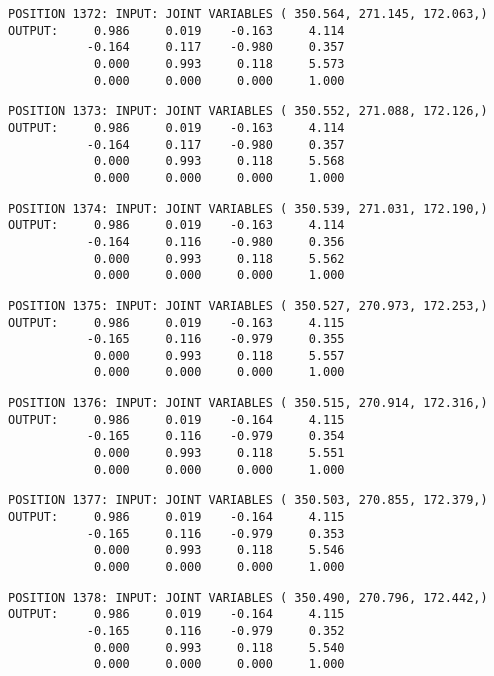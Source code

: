 \begin{verbatim}
POSITION 1372: INPUT: JOINT VARIABLES ( 350.564, 271.145, 172.063,)
OUTPUT:     0.986     0.019    -0.163     4.114
           -0.164     0.117    -0.980     0.357
            0.000     0.993     0.118     5.573
            0.000     0.000     0.000     1.000
\end{verbatim} \pagebreak[1]\begin{verbatim}
POSITION 1373: INPUT: JOINT VARIABLES ( 350.552, 271.088, 172.126,)
OUTPUT:     0.986     0.019    -0.163     4.114
           -0.164     0.117    -0.980     0.357
            0.000     0.993     0.118     5.568
            0.000     0.000     0.000     1.000
\end{verbatim} \pagebreak[1]\begin{verbatim}
POSITION 1374: INPUT: JOINT VARIABLES ( 350.539, 271.031, 172.190,)
OUTPUT:     0.986     0.019    -0.163     4.114
           -0.164     0.116    -0.980     0.356
            0.000     0.993     0.118     5.562
            0.000     0.000     0.000     1.000
\end{verbatim} \pagebreak[1]\begin{verbatim}
POSITION 1375: INPUT: JOINT VARIABLES ( 350.527, 270.973, 172.253,)
OUTPUT:     0.986     0.019    -0.163     4.115
           -0.165     0.116    -0.979     0.355
            0.000     0.993     0.118     5.557
            0.000     0.000     0.000     1.000
\end{verbatim} \pagebreak[1]\begin{verbatim}
POSITION 1376: INPUT: JOINT VARIABLES ( 350.515, 270.914, 172.316,)
OUTPUT:     0.986     0.019    -0.164     4.115
           -0.165     0.116    -0.979     0.354
            0.000     0.993     0.118     5.551
            0.000     0.000     0.000     1.000
\end{verbatim} \pagebreak[1]\begin{verbatim}
POSITION 1377: INPUT: JOINT VARIABLES ( 350.503, 270.855, 172.379,)
OUTPUT:     0.986     0.019    -0.164     4.115
           -0.165     0.116    -0.979     0.353
            0.000     0.993     0.118     5.546
            0.000     0.000     0.000     1.000
\end{verbatim} \pagebreak[1]\begin{verbatim}
POSITION 1378: INPUT: JOINT VARIABLES ( 350.490, 270.796, 172.442,)
OUTPUT:     0.986     0.019    -0.164     4.115
           -0.165     0.116    -0.979     0.352
            0.000     0.993     0.118     5.540
            0.000     0.000     0.000     1.000
\end{verbatim} \pagebreak[1]\begin{verbatim}

\end{verbatim}

